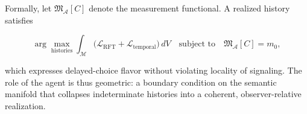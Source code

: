 Formally, let \(\mathfrak{M}_{\mathcal{A}}[C]\) denote the measurement functional. A realized history satisfies

\begin{equation}
\arg\max_{\text{histories}} \int_{\mathcal{M}} \big( \mathcal{L}_{\text{RFT}} + \mathcal{L}_{\text{temporal}} \big)\, dV \quad \text{subject to} \quad \mathfrak{M}_{\mathcal{A}}[C]=m_0,
\end{equation}

which expresses delayed-choice flavor without violating locality of signaling. The role of the agent is thus geometric: a boundary condition on the semantic manifold that collapses indeterminate histories into a coherent, observer-relative realization.